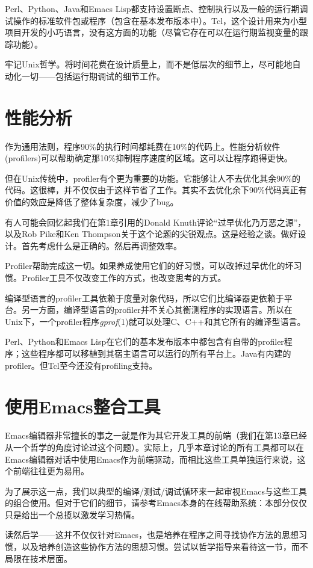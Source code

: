 \documentclass[12pt,oneside]{ctexbook}
\begin{document}
\begin{common-format}
Perl、Python、Java和Emacs Lisp都支持设置断点、控制执行以及一般的运行期调试操作的标准软件包或程序（包含在基本发布版本中）。Tcl，这个设计用来为小型项目开发的小巧语言，没有这方面的功能（尽管它存在可以在运行期监视变量的跟踪功能）。

牢记Unix哲学。将时间花费在设计质量上，而不是低层次的细节上，尽可能地自动化一切——包括运行期调试的细节工作。


\section{性能分析}
作为通用法则，程序90\%{}的执行时间都耗费在10\%{}的代码上。性能分析软件(profilers)可以帮助确定那10\%{}抑制程序速度的区域。这可以让程序跑得更快。

但在Unix传统中，profiler有个更为重要的功能。它能够让人不去优化其余90\%{}的代码。这很棒，并不仅仅由于这样节省了工作。其实不去优化余下90\%{}代码真正有价值的效应是降低了整体复杂度，减少了bug。

有人可能会回忆起我们在第1章引用的Donald Knuth评论“过早优化乃万恶之源”，以及Rob Pike和Ken Thompson关于这个论题的尖锐观点。这是经验之谈。做好设计。首先考虑什么是正确的。然后再调整效率。

Profiler帮助完成这一切。如果养成使用它们的好习惯，可以改掉过早优化的坏习惯。Profiler工具不仅改变工作的方式，也改变思考的方式。

编译型语言的profiler工具依赖于度量对象代码，所以它们比编译器更依赖于平台。另一方面，编译型语言的profiler并不关心其衡测程序的实现语言。所以在Unix下，一个profiler程序\textit{gprof}(1)就可以处理C、C++和其它所有的编译型语言。

Perl、Python和Emacs Lisp在它们的基本发布版本中都包含有自带的profiler程序；这些程序都可以移植到其宿主语言可以运行的所有平台上。Java有内建的profiler。但Tcl至今还没有profiling支持。

\section{使用Emacs整合工具}
Emacs编辑器非常擅长的事之一就是作为其它开发工具的前端（我们在第13章已经从一个哲学的角度讨论过这个问题）。实际上，几乎本章讨论的所有工具都可以在Emacs编辑器对话中使用Emacs作为前端驱动，而相比这些工具单独运行来说，这个前端往往更为易用。

为了展示这一点，我们以典型的编译/测试/调试循环来一起审视Emacs与这些工具的组合使用。但对于它们的细节，请参考Emacs本身的在线帮助系统：本部分仅仅只是给出一个总揽以激发学习热情。

读然后学——这并不仅仅针对Emacs，也是培养在程序之间寻找协作方法的思想习惯，以及培养创造这些协作方法的思想习惯。尝试以哲学指导来看待这一节，而不局限在技术层面。



\end{common-format}
\end{document}
